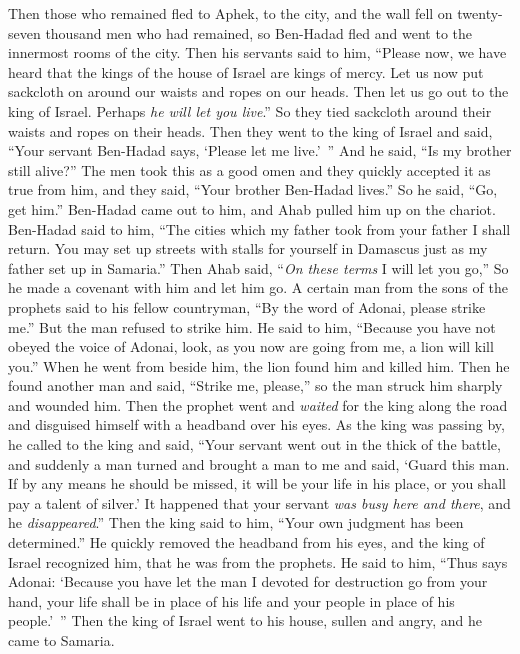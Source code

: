 \begin{biblechapter}
\verse Then those who remained fled to Aphek, to the city, and the wall fell on twenty-seven thousand men who had remained, so Ben-Hadad fled and went to the innermost rooms of the city.
\verse Then his servants said to him, “Please now, we have heard that the kings of the house of Israel are kings of mercy. Let us now put sackcloth on around our waists and ropes on our heads. Then let us go out to the king of Israel. Perhaps \textit{he will let you live}.”
\verse So they tied sackcloth around their waists and ropes on their heads. Then they went to the king of Israel and said, “Your servant Ben-Hadad says, ‘Please let me live.’ ” And he said, “Is my brother still alive?”
\verse The men took this as a good omen and they quickly accepted it as true from him, and they said, “Your brother Ben-Hadad lives.” So he said, “Go, get him.” Ben-Hadad came out to him, and Ahab pulled him up on the chariot.
\verse Ben-Hadad said to him, “The cities which my father took from your father I shall return. You may set up streets with stalls for yourself in Damascus just as my father set up in Samaria.” Then Ahab said, “\textit{On these terms} I will let you go,” So he made a covenant with him and let him go.
\verse A certain man from the sons of the prophets said to his fellow countryman, “By the word of Adonai, please strike me.” But the man refused to strike him.
\verse He said to him, “Because you have not obeyed the voice of Adonai, look, as you now are going from me, a lion will kill you.” When he went from beside him, the lion found him and killed him.
\verse Then he found another man and said, “Strike me, please,” so the man struck him sharply and wounded him.
\verse Then the prophet went and \textit{waited} for the king along the road and disguised himself with a headband over his eyes.
\verse As the king was passing by, he called to the king and said, “Your servant went out in the thick of the battle, and suddenly a man turned and brought a man to me and said, ‘Guard this man. If by any means he should be missed, it will be your life in his place, or you shall pay a talent of silver.’
\verse It happened that your servant \textit{was busy here and there}, and he \textit{disappeared}.” Then the king said to him, “Your own judgment has been determined.”
\verse He quickly removed the headband from his eyes, and the king of Israel recognized him, that he was from the prophets.
\verse He said to him, “Thus says Adonai: ‘Because you have let the man I devoted for destruction go from your hand, your life shall be in place of his life and your people in place of his people.’ ”
\verse Then the king of Israel went to his house, sullen and angry, and he came to Samaria.
\end{biblechapter}

